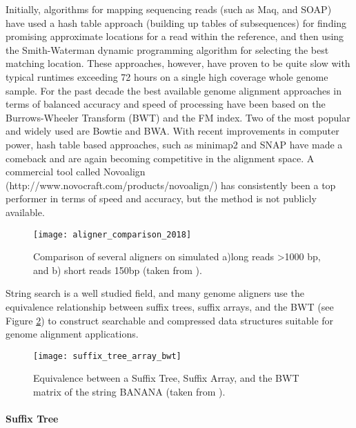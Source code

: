 Initially, algorithms for mapping sequencing reads (such as Maq\autocite{li2008mapping}, and SOAP\autocite{li2008soap}) have used a hash table approach\autocite{reinert2015alignment} (building up tables of subsequences) for finding promising approximate locations for a read within the reference, and then using the Smith-Waterman\autocite{smith1981comparison} dynamic programming algorithm for selecting the best matching location. These approaches, however, have proven to be quite slow with typical runtimes exceeding 72 hours on a single high coverage whole genome sample. For the past decade the best available genome alignment approaches in terms of balanced accuracy and speed of processing have been based on the Burrows-Wheeler Transform (BWT)\autocite{burrows1994block} and the FM index\autocite{ferragina2000opportunistic}. Two of the most popular and widely used are Bowtie\autocite{langmead2009ultrafast} and BWA\autocite{li2009fast}. With recent improvements in computer power, hash table based approaches, such as minimap2\autocite{li2018minimap2} and SNAP\autocite{zaharia2011faster} have made a comeback and are again becoming competitive in the alignment space. A commercial tool called Novoalign (http://www.novocraft.com/products/novoalign/) has consistently been a top performer in terms of speed and accuracy, but the method is not publicly available.

\begin{figure}[H]
    \texttt{[image: aligner\_comparison\_2018]}
    \centering
    \caption {Comparison of several aligners on simulated a)long reads >1000 bp, and b) short reads 150bp (taken from \autocite{li2018minimap2}).}
    \label{fig:aligner_comparison_2018}
\end{figure}

String search is a well studied field, and many genome aligners use the equivalence relationship between suffix trees, suffix arrays, and the BWT (see Figure \ref{fig:suffix_tree_array_bwt}) to construct searchable and compressed data structures suitable for genome alignment applications.

\begin{figure}[H]
    \texttt{[image: suffix\_tree\_array\_bwt]}
    \centering
    \caption {Equivalence between a Suffix Tree, Suffix Array, and the BWT matrix of the string BANANA (taken from \autocite{langmead_teaching}).}
    \label{fig:suffix_tree_array_bwt}
\end{figure}

\paragraph{Suffix Tree}

